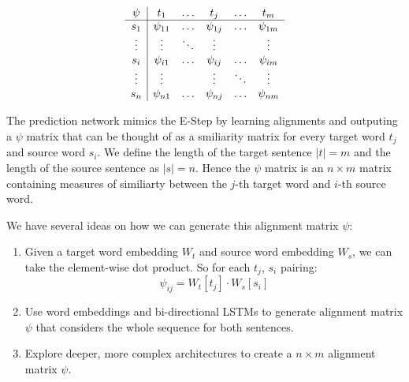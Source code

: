\documentclass[twoside,twocolumn]{article}
\begin{document}
\begin{equation}
  \centering
\begin{array}{c|ccccc}
\psi & t_1       & \hdots & t_j       & \hdots & t_m       \\ \hline
s_1  & \psi_{11} & \hdots & \psi_{1j} & \hdots & \psi_{1m} \\
\vdots  & \vdots & \ddots & \vdots &  & \vdots \\
s_i  & \psi_{i1} & \hdots & \psi_{ij} & \hdots & \psi_{im} \\
\vdots  & \vdots &  & \vdots & \ddots & \vdots \\
s_n  & \psi_{n1} & \hdots & \psi_{nj} & \hdots & \psi_{nm}
\end{array}
\end{equation}

The prediction network mimics the E-Step by learning alignments and outputing a $\psi$ matrix that can be thought of as a smiliarity matrix for every target word $t_j$ and source word $s_i$. We define the length of the target sentence $|t| = m$ and the length of the source sentence as $|s|=n$. Hence the $\psi$ matrix is an $n \times m$ matrix containing measures of similiarty between the $j$-th target word and $i$-th source word.

We have several ideas on how we can generate this alignment matrix $\psi$:
\begin{enumerate}
  \item Given a target word embedding $W_t$ and source word embedding $W_s$, we can take the element-wise dot product. So for each $t_j$, $s_i$ pairing:
  \begin{equation}
    \psi_{ij} = W_t[t_j] \cdot W_s[s_i]
  \end{equation}
  \item Use word embeddings and bi-directional LSTMs to generate alignment matrix $\psi$ that considers the whole sequence for both sentences.
  \item Explore deeper, more complex architectures to create a $n \times m$ alignment matrix $\psi$.
\end{enumerate}
\end{document}
